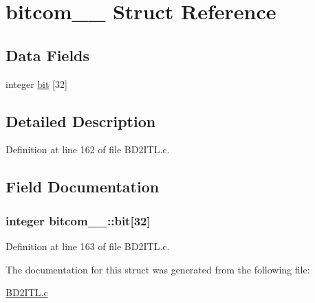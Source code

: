 \hypertarget{structbitcom__1__}{}\section{bitcom\+\_\+\_\+ Struct Reference}
\label{structbitcom__1__}
\subsection*{Data Fields}
\begin{DoxyCompactItemize}
\item 
integer \hyperlink{structbitcom__1___a9a69a13c9ed6fba7836e0f285daf5051}{bit} \mbox{[}32\mbox{]}
\end{DoxyCompactItemize}


\subsection{Detailed Description}


Definition at line 162 of file B\+D2\+I\+T\+L.\+c.



\subsection{Field Documentation}
\subsubsection[{\texorpdfstring{bit}{bit}}]{\setlength{\rightskip}{0pt plus 5cm}integer bitcom\+\_\+\_\+\+::bit\mbox{[}32\mbox{]}}\hypertarget{structbitcom__1___a9a69a13c9ed6fba7836e0f285daf5051}{}\label{structbitcom__1___a9a69a13c9ed6fba7836e0f285daf5051}


Definition at line 163 of file B\+D2\+I\+T\+L.\+c.



The documentation for this struct was generated from the following file\+:\begin{DoxyCompactItemize}
\item 
\hyperlink{BD2ITL_8c}{B\+D2\+I\+T\+L.\+c}\end{DoxyCompactItemize}
